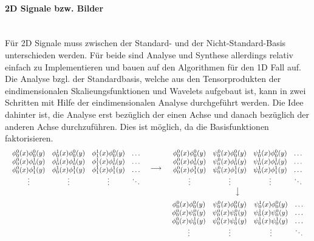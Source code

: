 \paragraph{2D Signale bzw. Bilder}~\\
Für 2D Signale muss zwischen der Standard- und der Nicht-Standard-Basis unterschieden werden. Für beide sind Analyse und Synthese allerdings relativ einfach zu Implementieren und bauen auf den Algorithmen für den 1D Fall auf.
Die Analyse bzgl. der Standardbasis, welche aus den Tensorprodukten der eindimensionalen Skalieungsfunktionen und Wavelets aufgebaut ist, kann in zwei Schritten mit Hilfe der eindimensionalen Analyse durchgeführt werden. Die Idee dahinter ist, die Analyse erst bezüglich der einen Achse und danach bezüglich der anderen Achse durchzuführen. Dies ist möglich, da die Basisfunktionen faktorisieren.
%
\[
\begin{array}{ccc}
{
\begin{array}{cccc}
\phi_0^0(x)\phi_0^0(y) & \phi_0^1(x)\phi_0^0(y) & \phi_1^1(x)\phi_0^0(y) & \hdots \\
\phi_0^0(x)\phi_0^1(y) & \phi_0^1(x)\phi_0^1(y) & \phi_1^1(x)\phi_0^1(y) & \hdots \\
\phi_0^0(x)\phi_1^1(y) & \phi_0^1(x)\phi_1^1(y) & \phi_1^1(x)\phi_1^1(y) & \hdots \\
\vdots & \vdots & \vdots & \ddots \\
\end{array}
} &
\longrightarrow &
{
\begin{array}{cccc}
\phi_0^0(x)\phi_0^0(y) & \psi_0^0(x)\phi_0^0(y) & \psi_0^1(x)\phi_0^0(y) & \hdots \\
\phi_0^0(x)\phi_0^1(y) & \psi_0^0(x)\phi_0^1(y) & \psi_0^1(x)\phi_0^1(y) & \hdots \\
\phi_0^0(x)\phi_1^1(y) & \psi_0^0(x)\phi_1^1(y) & \psi_0^1(x)\phi_1^1(y) & \hdots \\
\vdots & \vdots & \vdots & \ddots \\
\end{array}
} \\
 &
 &
\big\downarrow \\[.25cm]
 &
 &
{
\begin{array}{cccc}
\phi_0^0(x)\phi_0^0(y) & \psi_0^0(x)\phi_0^0(y) & \psi_0^1(x)\phi_0^0(y) & \hdots \\
\phi_0^0(x)\psi_0^0(y) & \psi_0^0(x)\psi_0^0(y) & \psi_0^1(x)\psi_0^0(y) & \hdots \\
\phi_0^0(x)\psi_0^1(y) & \psi_0^0(x)\psi_0^1(y) & \psi_0^1(x)\psi_0^1(y) & \hdots \\
\vdots & \vdots & \vdots & \ddots \\
\end{array}
}
\end{array}
\]
